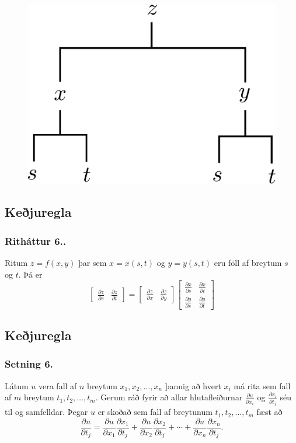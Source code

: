  \begin{figure}[h!]
           \centering
            \includegraphics[width=0.35\linewidth]{chain2}
    \end{figure}


\subsection{Keðjuregla} 

\subsubsection{Ritháttur 6..}
 Ritum $z=f(x,y)$ þar sem $x=x(s,t)$ og $y=y(s,t)$ eru föll af breytum $s$ og  $t$.  Þá er 
$$\begin{bmatrix}\frac{\partial z}{\partial s} 
& \frac{\partial z}{\partial t}\end{bmatrix}
=\begin{bmatrix}\frac{\partial z}{\partial x} 
& \frac{\partial z}{\partial y}\end{bmatrix}
\begin{bmatrix}\frac{\partial x}{\partial s} 
& \frac{\partial x}{\partial t}\\
\frac{\partial y}{\partial s} 
& \frac{\partial y}{\partial t}
\end{bmatrix}$$

 


\subsection{Keðjuregla} 

\subsubsection{Setning 6.}
Látum $u$ vera fall af $n$ breytum $x_1, x_2, \ldots, x_n$ þannig að hvert $x_i$ má rita sem fall af $m$ breytum $t_1, t_2, \ldots, t_m$.  Gerum ráð fyrir að allar hlutafleiðurnar $\frac{\partial u}{\partial x_i}$ og $\frac{\partial x_i}{\partial t_j}$ séu til og samfelldar.  Þegar $u$ er skoðað sem fall af breytunum $t_1, t_2, \ldots, t_m$ fæst að 
$$\frac{\partial u}{\partial t_j}=
\frac{\partial u}{\partial x_1}\frac{\partial x_1}{\partial t_j}
+\frac{\partial u}{\partial x_2}\frac{\partial x_2}{\partial t_j}
+\cdots+
\frac{\partial u}{\partial x_n}\frac{\partial x_n}{\partial t_j}.$$

